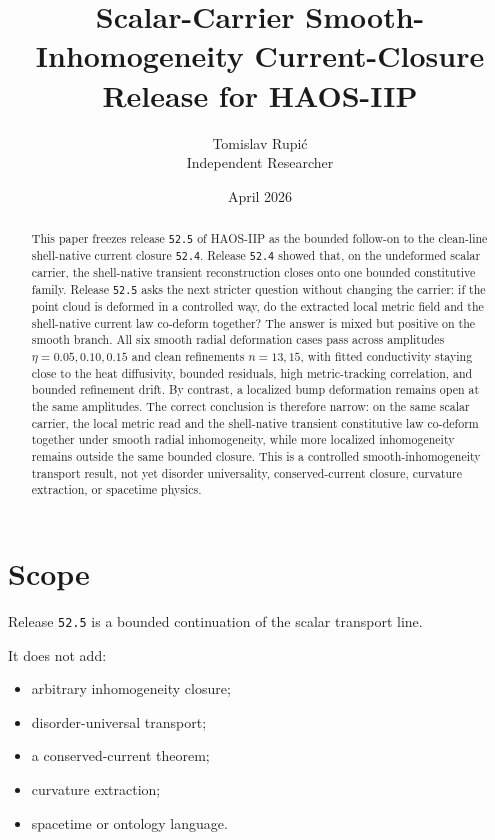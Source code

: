 \documentclass[11pt]{article}
\title{Scalar-Carrier Smooth-Inhomogeneity Current-Closure Release for HAOS-IIP}
\author{Tomislav Rupi\'c \\ Independent Researcher}
\date{April 2026}
\begin{document}
\maketitle

\begin{abstract}
This paper freezes release \texttt{52.5} of HAOS-IIP as the bounded follow-on to the clean-line shell-native current closure \texttt{52.4}. Release \texttt{52.4} showed that, on the undeformed scalar carrier, the shell-native transient reconstruction closes onto one bounded constitutive family. Release \texttt{52.5} asks the next stricter question without changing the carrier: if the point cloud is deformed in a controlled way, do the extracted local metric field and the shell-native current law co-deform together? The answer is mixed but positive on the smooth branch. All six smooth radial deformation cases pass across amplitudes \(\eta = 0.05, 0.10, 0.15\) and clean refinements \(n = 13, 15\), with fitted conductivity staying close to the heat diffusivity, bounded residuals, high metric-tracking correlation, and bounded refinement drift. By contrast, a localized bump deformation remains open at the same amplitudes. The correct conclusion is therefore narrow: on the same scalar carrier, the local metric read and the shell-native transient constitutive law co-deform together under smooth radial inhomogeneity, while more localized inhomogeneity remains outside the same bounded closure. This is a controlled smooth-inhomogeneity transport result, not yet disorder universality, conserved-current closure, curvature extraction, or spacetime physics.
\end{abstract}

\tableofcontents

\section{Scope}

Release \texttt{52.5} is a bounded continuation of the scalar transport line.

It does not add:
\begin{itemize}
\item arbitrary inhomogeneity closure;
\item disorder-universal transport;
\item a conserved-current theorem;
\item curvature extraction;
\item spacetime or ontology language.
\end{itemize}
\end{document}
